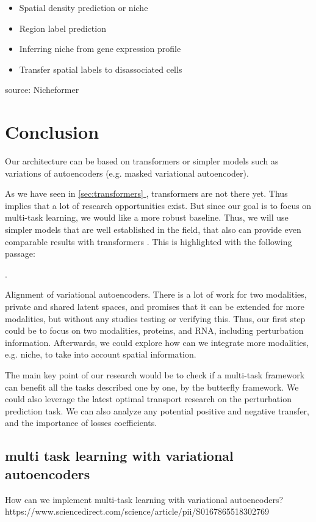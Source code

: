 \documentclass[12pt, a4paper]{article}
\newcommand*{\fullref}[1]{\hyperref[{#1}]{\ref*{#1} \nameref*{#1}}}
\begin{document}
\begin{itemize}
  \item Spatial density prediction or niche 
  \item Region label prediction 
  \item Inferring niche from gene expression profile
  \item Transfer spatial labels to disassociated cells
\end{itemize}
source: Nicheformer

\clearpage

\section{Conclusion}

Our architecture can be based on transformers or simpler models such as variations of autoencoders (e.g. masked variational autoencoder).

As we have seen in \fullref{sec:transformers}, transformers are not there yet. Thus implies that a lot of research opportunities exist. But since our goal is to focus on multi-task learning, we would like a more robust baseline. Thus, we will use simpler models that are well established in the field, that also can provide even comparable results with transformers \cite{szalataTransformersSinglecellOmics2024}. This is highlighted with the following passage:

 \cite{szalataTransformersSinglecellOmics2024}.

Alignment of variational autoencoders. There is a lot of work for two modalities, private and shared latent spaces, and promises that it can be extended for more modalities, but without any studies testing or verifying this. Thus, our first step could be to focus on two modalities, proteins, and RNA, including perturbation information. Afterwards, we could explore how can we integrate more modalities, e.g. niche, to take into account spatial information.

The main key point of our research would be to check if a multi-task framework can benefit all the tasks described one by one, by the butterfly framework. We could also leverage the latest optimal transport research on the perturbation prediction task. We can also analyze any potential positive and negative transfer, and the importance of losses coefficients.

\subsection{multi task learning with variational autoencoders}

How can we implement multi-task learning with variational autoencoders?
https://www.sciencedirect.com/science/article/pii/S0167865518302769

\clearpage



\end{document}
